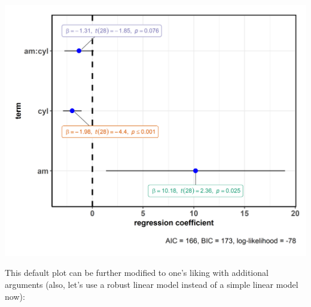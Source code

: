 \documentclass[]{article}
\begin{document}
\includegraphics[width=1\linewidth]{./figures/paper-ggcoefstats1-1}

This default plot can be further modified to one's liking with
additional arguments (also, let's use a robust linear model instead of a
simple linear model now):
\end{document}

